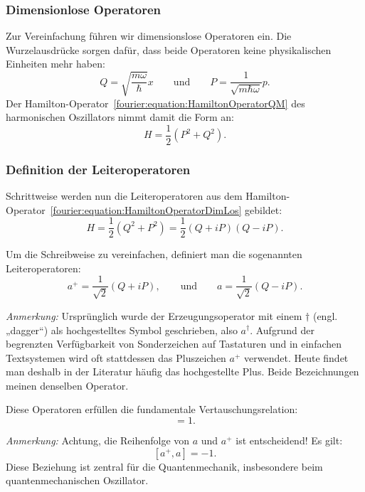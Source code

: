 		\subsubsection{Dimensionlose Operatoren\label{fourier:subsubsection:DimensionsloseOperatoren}}
			Zur Vereinfachung führen wir dimensionslose Operatoren ein.
			Die Wurzelausdrücke sorgen dafür, dass beide Operatoren keine physikalischen Einheiten mehr haben:
			\[
				Q = \sqrt{\frac{m\omega}{\hbar}}x
				\qquad\text{und}\qquad
				P = \frac{1}{\sqrt{m\hbar\omega}}p.
			\]
			Der Hamilton-Operator~\ref{fourier:equation:HamiltonOperatorQM} des harmonischen Oszillators nimmt damit die Form an:
			\begin{equation}\label{fourier:equation:HamiltonOperatorDimLos}
				H = \frac{1}{2}(P^2 + Q^2).
			\end{equation}

		\subsubsection{Definition der Leiteroperatoren\label{fourier:subsubsection:DefinitionLeiteroperatoren}}
			Schrittweise werden nun die Leiteroperatoren aus dem Hamilton-Operator~\ref{fourier:equation:HamiltonOperatorDimLos} gebildet:
			\[
				H = \frac{1}{2}(Q^2 + P^2) = \frac{1}{2}(Q + iP)(Q - iP).
			\]

			Um die Schreibweise zu vereinfachen, definiert man die sogenannten Leiteroperatoren:
			\begin{equation}
				a^+ = \frac{1}{\sqrt{2}}(Q + iP),
				\qquad\text{und}\qquad
				a = \frac{1}{\sqrt{2}}(Q - iP).
			\end{equation}

			\textit{Anmerkung:}
			Ursprünglich wurde der Erzeugungsoperator mit einem $\dagger$ (engl. „dagger“) als hochgestelltes Symbol geschrieben, also $a^\dagger$.
			Aufgrund der begrenzten Verfügbarkeit von Sonderzeichen auf Tastaturen und in einfachen Textsystemen wird oft stattdessen das Pluszeichen $a^+$ verwendet.
			Heute findet man deshalb in der Literatur häufig das hochgestellte Plus.
			Beide Bezeichnungen meinen denselben Operator.

			Diese Operatoren erfüllen die fundamentale Vertauschungsrelation:
			\begin{equation}
				[a, a^+] = 1.
			\end{equation}

			\textit{Anmerkung:}
			Achtung, die Reihenfolge von $a$ und $a^+$ ist entscheidend! Es gilt:
			\[
				[a^+, a] = -1.
			\]
			Diese Beziehung ist zentral für die Quantenmechanik, insbesondere beim quantenmechanischen Oszillator.

